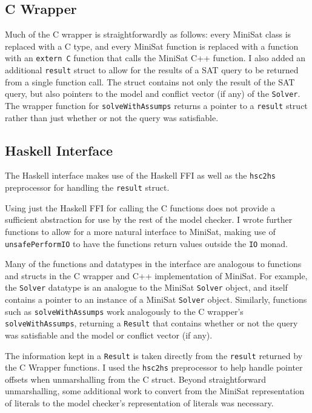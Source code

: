 \documentclass[12pt,a4paper,twoside,openright]{report}
\begin{document}
\subsection{C Wrapper}

Much of the C wrapper is straightforwardly as follows: every MiniSat class is replaced with a C
type, and every MiniSat function is replaced with a function with an \verb,extern C, function that
calls the MiniSat C++ function.
I also added an additional \verb,result, struct to allow for the results of a SAT query to
be returned from a single function call. The struct contains not only the result of the SAT
query, but also pointers to the model and conflict vector (if any) of the \verb,Solver,.
The wrapper function for \verb,solveWithAssumps, returns a pointer to a \verb,result, struct
rather than just whether or not the query was satisfiable.

\subsection{Haskell Interface}

The Haskell interface makes use of the Haskell FFI as well as the \verb,hsc2hs, preprocessor
for handling the \verb,result, struct.

Using just the Haskell FFI for calling the C functions does not provide a
sufficient abstraction for use by the rest of the model checker.
I wrote further functions to allow for a more natural interface to MiniSat,
 making use of \verb,unsafePerformIO, to have the functions return
values outside the \verb,IO, monad.

Many of the functions and datatypes in the interface are analogous to functions and structs in
the C wrapper and C++ implementation of MiniSat. For example, the \verb,Solver, datatype is an
analogue to the MiniSat \verb,Solver, object, and itself contains a pointer to an instance of
a MiniSat \verb,Solver, object. Similarly, functions such as \verb,solveWithAssumps, work
analogously to the C wrapper's \verb,solveWithAssumps,, returning a \verb,Result, that contains
whether or not the query was satisfiable and the model or conflict vector (if any).

The information kept in a \verb,Result, is taken directly from the \verb,result, returned by
the C Wrapper functions. I used the \verb,hsc2hs, preprocessor to help handle pointer offsets
when unmarshalling from the C struct. Beyond straightforward unmarshalling, some additional work
to convert from the MiniSat representation of literals to the model checker’s representation of
literals was necessary.
\end{document}
